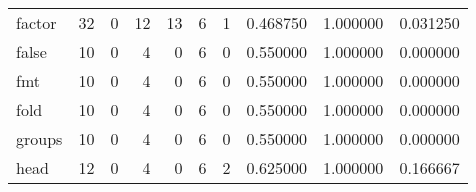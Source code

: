 \begin{tabular}{lrrrrrrrrr}
factor    &                                       32 &                                                  0 &                                                 12 &                                                 13 &                                                  6 &                                                  1 &                                           0.468750 &                               1.000000 &                             0.031250 \\
false     &                                       10 &                                                  0 &                                                  4 &                                                  0 &                                                  6 &                                                  0 &                                           0.550000 &                               1.000000 &                             0.000000 \\
fmt       &                                       10 &                                                  0 &                                                  4 &                                                  0 &                                                  6 &                                                  0 &                                           0.550000 &                               1.000000 &                             0.000000 \\
fold      &                                       10 &                                                  0 &                                                  4 &                                                  0 &                                                  6 &                                                  0 &                                           0.550000 &                               1.000000 &                             0.000000 \\
groups    &                                       10 &                                                  0 &                                                  4 &                                                  0 &                                                  6 &                                                  0 &                                           0.550000 &                               1.000000 &                             0.000000 \\
head      &                                       12 &                                                  0 &                                                  4 &                                                  0 &                                                  6 &                                                  2 &                                           0.625000 &                               1.000000 &                             0.166667 \\

\end{tabular}

